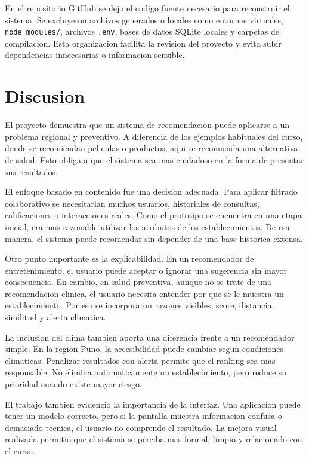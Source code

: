 \documentclass[12pt,a4paper]{article}
\begin{document}
En el repositorio GitHub se dejo el codigo fuente necesario para reconstruir el sistema. Se excluyeron archivos generados o locales como entornos virtuales, \texttt{node\_modules/}, archivos \texttt{.env}, bases de datos SQLite locales y carpetas de compilacion. Esta organizacion facilita la revision del proyecto y evita subir dependencias innecesarias o informacion sensible.

\section{Discusion}
El proyecto demuestra que un sistema de recomendacion puede aplicarse a un problema regional y preventivo. A diferencia de los ejemplos habituales del curso, donde se recomiendan peliculas o productos, aqui se recomienda una alternativa de salud. Esto obliga a que el sistema sea mas cuidadoso en la forma de presentar sus resultados.

El enfoque basado en contenido fue una decision adecuada. Para aplicar filtrado colaborativo se necesitarian muchos usuarios, historiales de consultas, calificaciones o interacciones reales. Como el prototipo se encuentra en una etapa inicial, era mas razonable utilizar los atributos de los establecimientos. De esa manera, el sistema puede recomendar sin depender de una base historica extensa.

Otro punto importante es la explicabilidad. En un recomendador de entretenimiento, el usuario puede aceptar o ignorar una sugerencia sin mayor consecuencia. En cambio, en salud preventiva, aunque no se trate de una recomendacion clinica, el usuario necesita entender por que se le muestra un establecimiento. Por eso se incorporaron razones visibles, score, distancia, similitud y alerta climatica.

La inclusion del clima tambien aporta una diferencia frente a un recomendador simple. En la region Puno, la accesibilidad puede cambiar segun condiciones climaticas. Penalizar resultados con alerta permite que el ranking sea mas responsable. No elimina automaticamente un establecimiento, pero reduce su prioridad cuando existe mayor riesgo.

El trabajo tambien evidencio la importancia de la interfaz. Una aplicacion puede tener un modelo correcto, pero si la pantalla muestra informacion confusa o demasiado tecnica, el usuario no comprende el resultado. La mejora visual realizada permitio que el sistema se perciba mas formal, limpio y relacionado con el curso.
\end{document}
